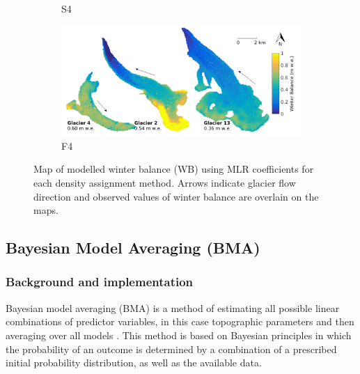 \documentclass{sfuthesis}
\newcommand{\swedots}{Arrows indicate glacier flow direction and observed values of winter balance are overlain on the maps. }
\begin{document}
\begin{figure}[H]
\begin{subfigure}[b]{0.475\textwidth}
            \caption[]%
            {{\small S4}}    
        \end{subfigure}
        \quad
        \begin{subfigure}[b]{0.475\textwidth}   
            \centering 
            \includegraphics[width=\textwidth]{MLRmap_Modelled_Observed8.png}
            \caption[]%
            {{\small F4}}    
        \end{subfigure}
        
        \caption[Map of modelled winter balance (WB) using MLR coefficients for each density assignment method]{Map of modelled winter balance (WB) using MLR coefficients for each density assignment method. \swedots} 
        \label{fig:allMLRmodelled}
    \end{figure}
    



\subsection{Bayesian Model Averaging (BMA)}
\label{sec:BMS}

\subsubsection{Background and implementation}

Bayesian model averaging (BMA) is a method of estimating all possible linear combinations of predictor variables, in this case topographic parameters and then averaging over all models \citep[e.g.][]{Raftery1997, Wasserman2000, Raftery2005}.  This method is based on Bayesian principles in which the probability of an outcome is determined by a combination of a prescribed initial probability distribution, as well as the available data. 
\end{document}

